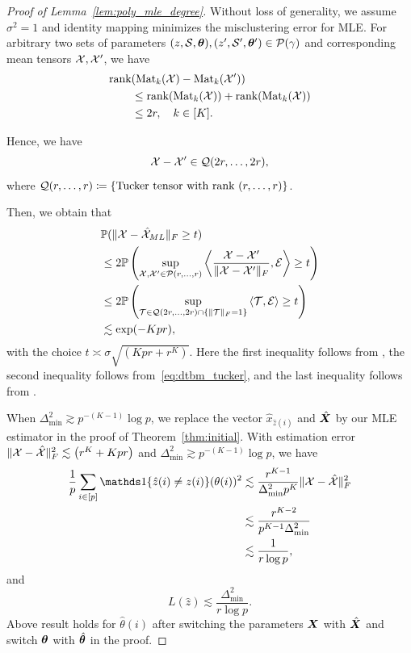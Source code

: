 \documentclass[journal]{IEEEtran}
\theoremstyle{definition}
\theoremstyle{definition}
\newcommand{\of}[1]{\left(#1\right)}
\newcommand{\ang}[1]{\left\langle#1\right\rangle}
\begin{document}
\begin{proof}[Proof of Lemma~\ref{lem:poly_mle_degree}] Without loss of generality, we assume $\sigma^2 = 1$ and identity mapping minimizes the misclustering error for MLE.
For arbitrary two sets of parameters $(z, \mathcal{S}, \boldsymbol{\theta}), (z', \mathcal{S}', \boldsymbol{\theta}') \in \mathcal{P}(\gamma)$ and corresponding mean tensors $\mathcal{X}, \mathcal{X}'$, we have 
\begin{align}
    &\text{rank}(\text{Mat}_k(\mathcal{X}) - \text{Mat}_k(\mathcal{X}')) \\
    & \quad \quad \leq \text{rank}(\text{Mat}_k(\mathcal{X})) + \text{rank}(\text{Mat}_k(\mathcal{X})) \\
    &\quad \quad \leq 2 r, \quad k \in [K].
\end{align}

Hence, we have
\begin{equation}\label{eq:dtbm_tucker}
    \tX - \tX' \in \tQ(2r, \ldots, 2 r),
\end{equation}
where $\mathcal{Q}(r, \ldots, r) \coloneqq \{ \text{Tucker tensor with rank }(r, \ldots,  r) \} $.

Then, we obtain that 
\begin{align}
     & \bbP(\FnormSize{}{\tX - \hat \tX_{ML}} \geq t) \\
     &\leq 2  \bbP\of{ \sup_{ \tX, \tX' \in \tP(r, 
\ldots, r)} \ang{ \frac{\tX - \tX'}{\FnormSize{}{\tX - \tX'}}, \tE  } \geq t } \\
     &\leq 2  \bbP\of{ \sup_{ \tT \in \tQ(2r, \ldots, 2r) \cap \{ \onormSize{}{\tT}_F = 1\} } \ang{ \tT, \tE  } \geq t } \\
     &\lesssim  \exp(-Kpr),
\end{align}
with the choice $t\asymp \sigma \sqrt{(Kpr + r^K)}$. Here the first inequality follows from \cite[Lemma 1]{wang2019multiway}, the second inequality follows from~\eqref{eq:dtbm_tucker}, and the last inequality follows from \cite[Lemma E5]{han2022optimal}.


When $\Delta_{\min}^2 \gtrsim p^{-(K-1)} \log p$, we replace the vector $\hat x_{\hat z(i)}$ and $\hat {\bm X}$ by our MLE estimator in the proof of Theorem~\ref{thm:initial}. With estimation error $\onormSize{}{\tX - \hat \tX}_F^2 \lesssim \of{ r^{K} + K p r}$ and $\Delta_{\min}^2 \gtrsim p^{-(K-1)} \log p$, we have 
\begin{align}
      \frac{1}{p} \sum_{i \in [p]} \ind\{ \hat z(i) \neq z(i) \} (\theta(i))^2 &\lesssim \frac{r^{K-1}}{\Delta_{\min}^2 p^{K}} \onormSize{}{\tX - \hat \tX}_F^2 \\
      &\lesssim \frac{r^{K-2}}{p^{K-1} \Delta_{\min}^2} \\
      & \lesssim \frac{1}{r \log p},
\end{align}
and 
\begin{equation}
     L(\hat z) \lesssim \frac{\Delta_{\min}^2}{r \log p}.
\end{equation}
Above result holds for $\hat \theta(i)$ after switching the parameters $\bm X$ with $\hat {\bm X}$ and switch $\boldsymbol{\theta}$ with $\hat {\boldsymbol{\theta}}$ in the proof. 



\end{proof}
\end{document}
